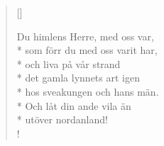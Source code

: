 \begin{verse}[\versewidth]

Du himlens Herre, med oss var,\\*
som förr du med oss varit har,\\*
och liva på vår strand\\*
det gamla lynnets art igen\\*
hos sveakungen och hans män.\\*
Och låt din ande vila än\\*
utöver nordanland!\\!




\end{verse}


